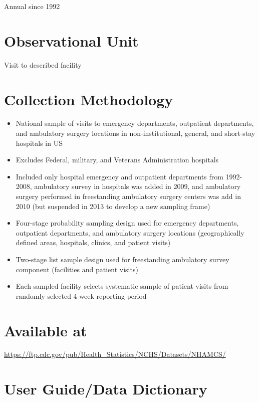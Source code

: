 \documentclass[
]{book}
\providecommand{\tightlist}{%
  \setlength{\itemsep}{0pt}\setlength{\parskip}{0pt}}
\begin{document}
Annual since 1992

\hypertarget{observational-unit-51}{%
\section{Observational Unit}\label{observational-unit-51}}

Visit to described facility

\hypertarget{collection-methodology-51}{%
\section{Collection Methodology}\label{collection-methodology-51}}

\begin{itemize}
\tightlist
\item
  National sample of visits to emergency departments, outpatient departments, and ambulatory surgery locations in non-institutional, general, and short-stay hospitals in US
\item
  Excludes Federal, military, and Veterans Administration hospitals
\item
  Included only hospital emergency and outpatient departments from 1992-2008, ambulatory survey in hospitals was added in 2009, and ambulatory surgery performed in freestanding ambulatory surgery centers was add in 2010 (but suspended in 2013 to develop a new sampling frame)
\item
  Four-stage probability sampling design used for emergency departments, outpatient departments, and ambulatory surgery locations (geographically defined areas, hospitals, clinics, and patient visits)
\item
  Two-stage list sample design used for freestanding ambulatory survey component (facilities and patient visits)
\item
  Each sampled facility selects systematic sample of patient visits from randomly selected 4-week reporting period
\end{itemize}

\hypertarget{available-at-51}{%
\section{Available at}\label{available-at-51}}

\url{https://ftp.cdc.gov/pub/Health_Statistics/NCHS/Datasets/NHAMCS/}

\hypertarget{user-guidedata-dictionary-51}{%
\section{User Guide/Data Dictionary}\label{user-guidedata-dictionary-51}}
\end{document}
